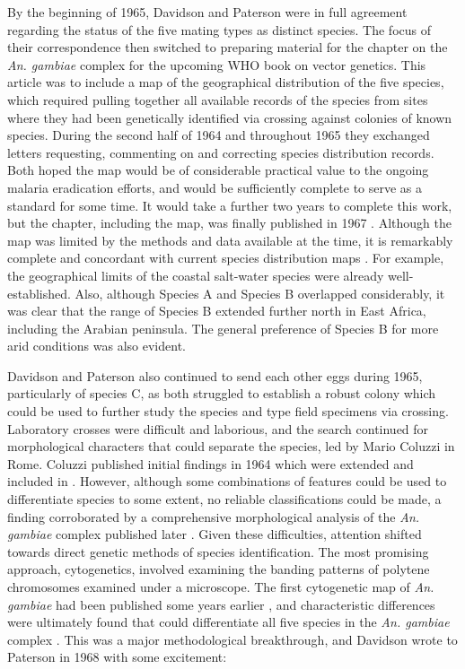 \documentclass[a4paper,11pt,abstracton,hidelinks]{scrartcl}
\begin{document}
By the beginning of 1965, Davidson and Paterson were in full agreement regarding the status of the five mating types as distinct species. 
The focus of their correspondence then switched to preparing material for the chapter on the \textit{An. gambiae} complex for the upcoming WHO book on vector genetics. 
This article was to include a map of the geographical distribution of the five species, which required pulling together all available records of the species from sites where they had been genetically identified via crossing against colonies of known species. 
During the second half of 1964 and throughout 1965 they exchanged letters requesting, commenting on and correcting species distribution records. 
Both hoped the map would be of considerable practical value to the ongoing malaria eradication efforts, and would be sufficiently complete to serve as a standard for some time. 
It would take a further two years to complete this work, but the chapter, including the map, was finally published in 1967 \citep{Davidson1967}. 
Although the map was limited by the methods and data available at the time, it is remarkably complete and concordant with current species distribution maps \citep{Wiebe2017}. 
For example, the geographical limits of the coastal salt-water species were already well-established. 
Also, although Species A and Species B overlapped considerably, it was clear that the range of Species B extended further north in East Africa, including the Arabian peninsula.
The general preference of Species B for more arid conditions was also evident.


Davidson and Paterson also continued to send each other eggs during 1965, particularly of species C, as both struggled to establish a robust colony which could be used to further study the species and type field specimens via crossing. 
Laboratory crosses were difficult and laborious, and the search continued for morphological characters that could separate the species, led by Mario Coluzzi in Rome. 
Coluzzi published initial findings in 1964 \citep{Coluzzi1964} which were extended and included in \citet{Davidson1967}. 
However, although some combinations of features could be used to differentiate species to some extent, no reliable classifications could be made, a finding corroborated by a comprehensive morphological analysis of the \textit{An. gambiae} complex published later \citep{Coetzee1989}. 
Given these difficulties, attention shifted towards direct genetic methods of species identification. 
The most promising approach, cytogenetics, involved examining the banding patterns of polytene chromosomes examined under a microscope. 
The first cytogenetic map of \textit{An. gambiae} had been published some years earlier \citep{Frizzi1956}, and characteristic differences were ultimately found that could differentiate all five species in the \textit{An. gambiae} complex \citep{Coluzzi1967,Coluzzi1968,Coluzzi1969}.
This was a major methodological breakthrough, and Davidson wrote to Paterson in 1968 with some excitement:
\end{document}
